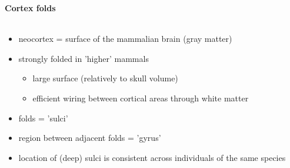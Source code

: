 \documentclass[8pt,t,usepdftitle=false]{beamer}
\def\figpath{\src/figures}
\begin{document}
\begin{frame}[plain]
  \frametitle{\ttl}
  \framesubtitle{Cortex folds}
  \begin{columns}
    \begin{column}{0.5\linewidth}
      \begin{itemize}
        \itemsep1ex
      \item<1-> neocortex = surface of the mammalian brain (gray matter)
      \item<1-> strongly folded in 'higher' mammals
        \begin{itemize}\itemsep1ex
        \item large surface (relatively to skull volume)
        \item efficient wiring between cortical areas through white matter
        \end{itemize}
      \item<2-> folds = 'sulci'
      \item<2-> region between adjacent folds = 'gyrus'
      \item<2-> location of (deep) sulci is consistent across individuals of the same species    
      \end{itemize}
    \end{column}
    \begin{column}{0.5\linewidth}
      \vspace*{-1.5cm}
      \begin{center}
      \end{center}
    \end{column}    
  \end{columns}
\end{frame}
\end{document}
